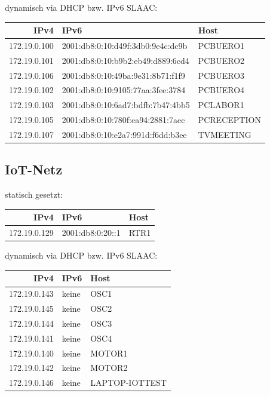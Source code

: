 \documentclass[11pt]{article}
\begin{document}
dynamisch via DHCP bzw. IPv6 SLAAC:

\begin{center}
\begin{tabular}{rll}
IPv4 & IPv6 & Host\\
\hline
172.19.0.100 & 2001:db8:0:10:d49f:3db0:9e4c:dc9b & PCBUERO1\\
172.19.0.101 & 2001:db8:0:10:b9b2:eb49:d889:6cd4 & PCBUERO2\\
172.19.0.106 & 2001:db8:0:10:49ba:9e31:8b71:f1f9 & PCBUERO3\\
172.19.0.102 & 2001:db8:0:10:9105:77aa:3fee:3784 & PCBUERO4\\
172.19.0.103 & 2001:db8:0:10:6ad7:bdfb:7b47:4bb5 & PCLABOR1\\
172.19.0.105 & 2001:db8:0:10:780f:ea94:2881:7aec & PCRECEPTION\\
172.19.0.107 & 2001:db8:0:10:e2a7:991d:f6dd:b3ee & TVMEETING\\
\end{tabular}
\end{center}
\subsection{IoT-Netz}
\label{sec:org1c4f75e}
statisch gesetzt:

\begin{center}
\begin{tabular}{rll}
IPv4 & IPv6 & Host\\
\hline
172.19.0.129 & 2001:db8:0:20::1 & RTR1\\
\end{tabular}
\end{center}

dynamisch via DHCP bzw. IPv6 SLAAC:

\begin{center}
\begin{tabular}{rll}
IPv4 & IPv6 & Host\\
\hline
172.19.0.143 & keine & OSC1\\
172.19.0.145 & keine & OSC2\\
172.19.0.144 & keine & OSC3\\
172.19.0.141 & keine & OSC4\\
172.19.0.140 & keine & MOTOR1\\
172.19.0.142 & keine & MOTOR2\\
172.19.0.146 & keine & LAPTOP-IOTTEST\\
\end{tabular}
\end{center}
\end{document}
